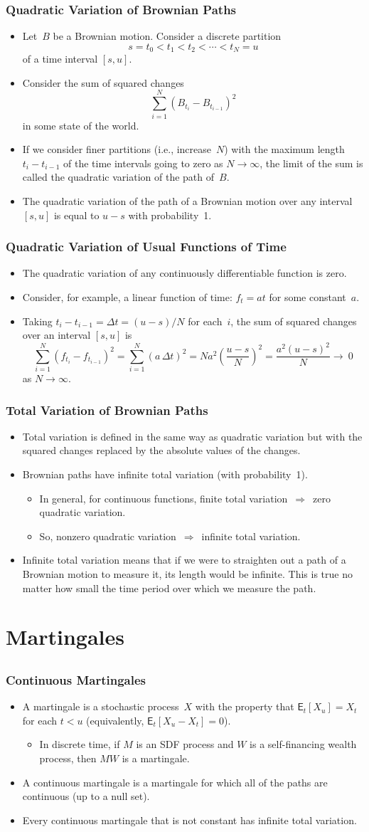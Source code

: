 \documentclass[10pt]{beamer}
\newcommand{\bi}{\begin{itemize}}
\newcommand{\ei}{\end{itemize}}
\newcommand{\im}{\item}
\newcommand{\mye}{\ensuremath{\mathsf{E}}}
\newcommand{\bfr}{\begin{frame}}
\begin{document}
\bfr\frametitle{Quadratic Variation of Brownian Paths}
\bi
\im Let~$B$ be a Brownian motion.  Consider a  discrete partition
$$s=t_0 < t_1 < t_2 < \cdots < t_N=u$$
of a time interval $[s,u]$.
\im Consider the sum of squared changes
$$\sum_{i=1}^N (B_{t_i}-B_{t_{i-1}})^2$$
in some state of the world.
\im If we consider finer partitions (i.e., increase~$N$) with the maximum length $t_i-t_{i-1}$ of the time intervals  going to zero as $N \rightarrow \infty$, the limit of the sum is called the quadratic variation of the path of~$B$.  
\im The quadratic variation of the path of a Brownian motion over any interval $[s,u]$ is equal to $u-s$ with probability~1.
\ei
\end{frame}


\bfr\frametitle{Quadratic Variation of Usual Functions of Time}
\bi
\im The quadratic variation of any continuously differentiable function is zero.  
\im Consider, for example, a
linear function of time: $f_t = at$ for some constant~$a$.  
\im Taking $t_i-t_{i-1} = \Delta t = (u-s)/N$ for each~$i$, the sum of 
squared changes over an interval $[s,u]$ is
$$\sum_{i=1}^N (f_{t_i}-f_{t_{i-1}})^2 = \sum_{i=1}^N  (a\,\Delta t)^2  = Na^2 \left(\frac{u-s}{N}\right)^2 = \frac{a^2(u-s)^2}{N} \rightarrow~0$$
as $N \rightarrow \infty$.  
\ei
\end{frame}


\bfr\frametitle{Total Variation of Brownian Paths}
\bi
\im Total variation is defined in the same way as quadratic variation but with the squared changes  replaced by the absolute values of the changes.   
\im Brownian paths have infinite total variation (with probability~1).
\bi
\im In general, for continuous functions, finite total variation $\,\Rightarrow\,$ zero quadratic variation.
\im So, nonzero quadratic variation $\,\Rightarrow\,$ infinite total variation.
\ei
\im Infinite total variation means that if we were to straighten out a path of a Brownian motion to measure it, its length would be infinite.  This is true no matter how small the time period over which we measure the path.
\ei
\end{frame}

\section{Martingales}
\subsection{}

\bfr\frametitle{Continuous Martingales}
\bi
\im A martingale  is a stochastic process~$X$ with the property that $\mye_t[X_u]= X_t$ for each $t<u$ (equivalently, $\mye_t[X_u-X_t] = 0$). 
\bi
\im In discrete time, if $M$ is an SDF process and $W$ is a self-financing wealth process, then $MW$ is a martingale.
\ei
\im A continuous martingale is a martingale for which all of the paths are continuous (up to a null set).  
\im Every continuous martingale that is not constant has infinite total variation.
\ei
\end{frame}
\end{document}
